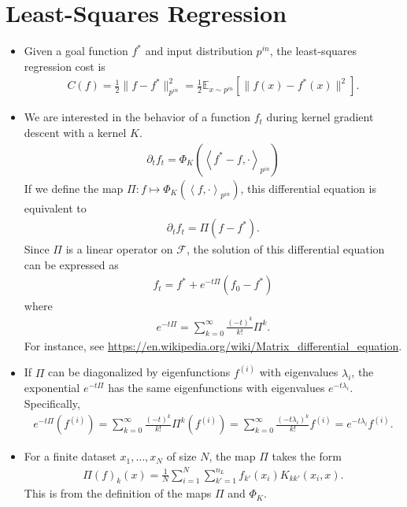 \documentclass[10pt]{article}
\newcommand{\EE}{\mathbb{E}}
\newcommand{\FF}{\mathcal{F}}
\newcommand{\inner}[2]{\left\langle #1, #2 \right\rangle}
\newcommand{\paran}[1]{{( #1 )}}
\newcommand{\pin}{{p^{in}}}
\begin{document}
\section{Least-Squares Regression}

\begin{itemize}
\item Given a goal function $f^*$ and input distribution $\pin$, the least-squares regression cost is
\begin{align*}
C(f) = \frac{1}{2} \|f - f^*\|^2_\pin = \frac{1}{2} \EE_{x \sim \pin} [ \|f(x) - f^*(x)\|^2 ].
\end{align*}
\item We are interested in the behavior of a function $f_t$ during kernel gradient descent with a kernel $K$.
\begin{align*}
\partial_t f_t = \Phi_K(\inner{f^* - f}{\cdot}_\pin)
\end{align*}
If we define the map $\Pi : f \mapsto \Phi_K(\inner{f}{\cdot}_\pin)$, this differential equation is equivalent to
\begin{align*}
\partial_t f_t = \Pi(f - f^*).
\end{align*}
Since $\Pi$ is a linear operator on $\FF$, the solution of this differential equation can be expressed as
\begin{align*}
f_t = f^* + e^{-t\Pi}(f_0 - f^*)
\end{align*}
where
\begin{align*}
e^{-t\Pi} = \sum_{k = 0}^\infty \frac{(-t)^k}{k!} \Pi^k.
\end{align*}
For instance, see \url{https://en.wikipedia.org/wiki/Matrix\_differential\_equation}.
\item If $\Pi$ can be diagonalized by eigenfunctions $f^\paran{i}$ with eigenvalues $\lambda_i$, the exponential $e^{-t\Pi}$ has the same eigenfunctions with eigenvalues $e^{-t \lambda_i}$. Specifically,
\begin{align*}
e^{-t\Pi}(f^\paran{i}) = \sum_{k = 0}^\infty \frac{(-t)^k}{k!} \Pi^k(f^\paran{i}) = \sum_{k = 0}^\infty \frac{(-t \lambda_i)^k}{k!} f^\paran{i} = e^{-t\lambda_i} f^\paran{i}.
\end{align*}
\item For a finite dataset $x_1, \ldots, x_N$ of size $N$, the map $\Pi$ takes the form
\begin{align*}
\Pi(f)_k(x) = \frac{1}{N} \sum_{i = 1}^N \sum_{k' = 1}^{n_L} f_{k'}(x_i) K_{kk'}(x_i,x).
\end{align*}
This is from the definition of the maps $\Pi$ and $\Phi_K$.

\end{itemize}
\end{document}
